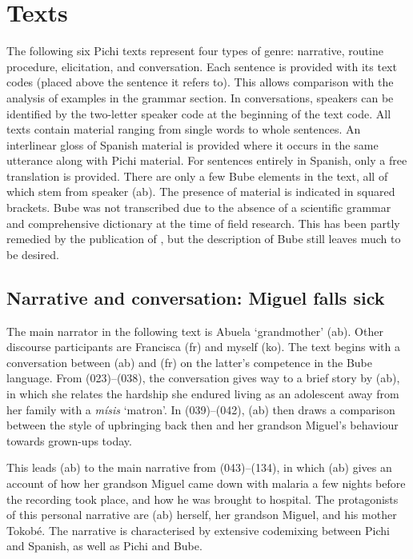 \chapter{Texts}

The following six Pichi texts represent four types of genre: narrative, routine procedure, elicitation, and conversation. Each sentence is provided with its text codes (placed above the sentence it refers to). This allows comparison with the analysis of examples in the grammar section. In conversations, speakers can be identified by the two-letter speaker code at the beginning of the text code. All texts contain  material ranging from single words to whole sentences. An interlinear gloss of Spanish material is provided where it occurs in the same utterance along with Pichi material. For sentences entirely in Spanish, only a free translation is provided. There are only a few Bube elements in the text, all of which stem from speaker (ab). The presence of  material is indicated in squared brackets. Bube was not transcribed due to the absence of a scientific grammar and comprehensive dictionary at the time of field research. This has been partly remedied by the publication of \citet{Bolekia2009}, but the description of Bube still leaves much to be desired.

\section{Narrative and conversation: Miguel falls sick}

The main narrator in the following text is Abuela ‘grandmother’ (ab). Other discourse participants are Francisca (fr) and myself (ko). The text begins with a conversation between (ab) and (fr) on the latter’s competence in the Bube language. From (023)–(038), the conversation gives way to a brief story by (ab), in which she relates the hardship she endured living as an adolescent away from her family with a \textit{mísis} ‘matron’. In (039)–(042), (ab) then draws a comparison between the style of upbringing back then and her grandson Miguel’s behaviour towards grown-ups today. 


This leads (ab) to the main narrative from (043)–(134), in which (ab) gives an account of how her grandson Miguel came down with malaria a few nights before the recording took place, and how he was brought to hospital. The protagonists of this personal narrative are (ab) herself, her grandson Miguel, and his mother Tokobé. The narrative is characterised by extensive codemixing between Pichi and Spanish, as well as Pichi and Bube. 

